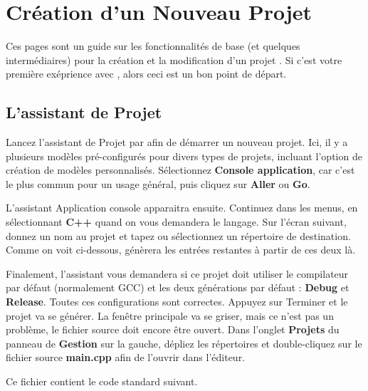 \section{Création d'un Nouveau Projet}\label{sec:create_project}

Ces pages sont un guide sur les fonctionnalités de base (et quelques intermédiaires) pour la création et la modification d'un projet \codeblocks. Si c'est votre première exéprience avec \codeblocks, alors ceci est un bon point de départ. 
 
\subsection{L'assistant de Projet}

Lancez l'assistant de Projet par  afin de démarrer un nouveau projet. Ici, il y a plusieurs modèles pré-configurés pour divers types de projets, incluant l'option de création de modèles personnalisés. Sélectionnez  \textbf{Console application}, car c'est le plus commun pour un usage général, puis cliquez sur \textbf{Aller} ou \textbf{Go}. 



L'assistant Application console apparaitra ensuite. Continuez dans les menus, en sélectionnant \textbf{C++} quand on vous demandera le langage. Sur l'écran suivant, donnez un nom au projet et tapez ou sélectionnez un répertoire de destination. Comme on voit ci-dessous, \codeblocks génèrera les entrées restantes à partir de ces deux là. 


Finalement, l'assistant vous demandera si ce projet doit utiliser le compilateur par défaut (normalement GCC) et les deux générations par défaut : \textbf{Debug} et \textbf{Release}. Toutes ces configurations sont correctes. Appuyez sur Terminer et le projet va se générer. La fenêtre principale va se griser, mais ce n'est pas un problème, le fichier source doit encore être ouvert. Dans l'onglet \textbf{Projets} du panneau de \textbf{Gestion} sur la gauche, dépliez les répertoires et double-cliquez sur le fichier source \textbf{main.cpp} afin de l'ouvrir dans l'éditeur. 

Ce fichier contient le code standard suivant.

